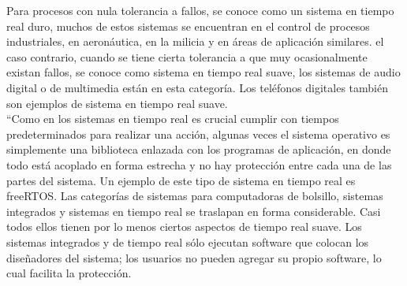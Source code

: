 Para procesos con nula tolerancia a fallos, se conoce como un sistema en tiempo real duro, muchos de estos sistemas se encuentran en el control de procesos industriales, en aeronáutica, en la milicia y en áreas de aplicación similares. el caso contrario, cuando se tiene cierta tolerancia a que muy ocasionalmente existan fallos, se conoce como sistema en tiempo real suave, los sistemas de audio digital o de multimedia están en esta categoría. Los teléfonos digitales también son ejemplos de sistema en tiempo real suave. \\




``Como en los sistemas en tiempo real es crucial cumplir con tiempos predeterminados para realizar una acción, algunas veces el sistema operativo es simplemente una biblioteca enlazada con los programas de aplicación, en donde todo está acoplado en forma estrecha y no hay protección entre cada una de las partes del sistema. Un ejemplo de este tipo de sistema en tiempo real es freeRTOS.  Las categorías de sistemas para computadoras de bolsillo, sistemas integrados y sistemas en tiempo real se traslapan en forma considerable. Casi todos ellos tienen por lo menos ciertos aspectos de tiempo real suave. Los sistemas integrados y de tiempo real sólo ejecutan software que colocan los diseñadores del sistema; los usuarios no pueden agregar su propio software, lo cual facilita la protección. \\

